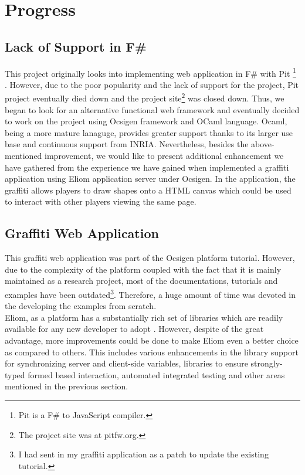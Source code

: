 \documentclass[12pt,fullpage]{article}
\begin{document}
\section{Progress}
\subsection{Lack of Support in F\#}
This project originally looks into implementing web application in F\# with Pit
\footnote{Pit is a F\# to JavaScript compiler.} \parencite{giannini12}. However,
due to the poor popularity and the lack of support for the project, Pit project eventually
died down and the project site\footnote{The project site was at pitfw.org.} was
closed down. Thus, we began to look for an alternative functional web framework and
eventually decided to work on the project using Ocsigen framework and OCaml
language. Ocaml, being a more mature lanaguge, provides greater support thanks
to its larger use base and continuous support from INRIA. Nevertheless, besides
the above-mentioned improvement, we would like to present additional enhancement
we have gathered from the experience we have gained when implemented a graffiti application using
Eliom application server under Ocsigen. In the application, the graffiti allows players to draw
shapes onto a HTML canvas which could be used to interact with other players
viewing the same page.

\subsection{Graffiti Web Application}
This graffiti web application was part of the Ocsigen platform tutorial. However, due
to the complexity of the platform coupled with the fact that it is mainly
maintained as a research project, most of the documentations, tutorials and
examples have been outdated\footnote{I had sent in my graffiti application as a patch
to update the existing tutorial.}. Therefore, a huge amount of time was devoted
in the developing the examples from scratch.
\\
Eliom, as a platform has a substantially rich set of libraries which are readily
available for any new developer to adopt \parencite{eliom}. However, despite of
the great advantage, more improvements could be done to make Eliom even a better
choice as compared to others. This includes
various enhancements in the library support for synchronizing server and client-side variables,
libraries to ensure strongly-typed formed based interaction, automated
integrated testing and other areas mentioned in the previous section.
\end{document}
